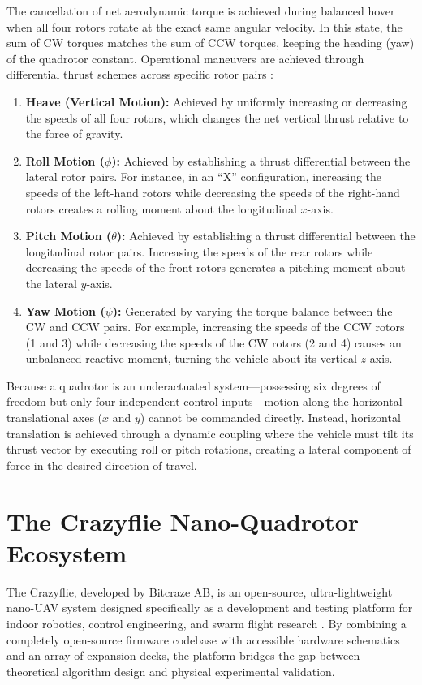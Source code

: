 The cancellation of net aerodynamic torque is achieved during balanced hover when all four rotors rotate at the exact same angular velocity. In this state, the sum of CW torques matches the sum of CCW torques, keeping the heading (yaw) of the quadrotor constant. Operational maneuvers are achieved through differential thrust schemes across specific rotor pairs \cite{ref_42, ref_49}:
\begin{enumerate}
    \item \textbf{Heave (Vertical Motion):} Achieved by uniformly increasing or decreasing the speeds of all four rotors, which changes the net vertical thrust relative to the force of gravity.
    \item \textbf{Roll Motion ($\phi$):} Achieved by establishing a thrust differential between the lateral rotor pairs. For instance, in an ``X'' configuration, increasing the speeds of the left-hand rotors while decreasing the speeds of the right-hand rotors creates a rolling moment about the longitudinal $x$-axis.
    \item \textbf{Pitch Motion ($\theta$):} Achieved by establishing a thrust differential between the longitudinal rotor pairs. Increasing the speeds of the rear rotors while decreasing the speeds of the front rotors generates a pitching moment about the lateral $y$-axis.
    \item \textbf{Yaw Motion ($\psi$):} Generated by varying the torque balance between the CW and CCW pairs. For example, increasing the speeds of the CCW rotors (1 and 3) while decreasing the speeds of the CW rotors (2 and 4) causes an unbalanced reactive moment, turning the vehicle about its vertical $z$-axis.
\end{enumerate}

Because a quadrotor is an underactuated system—possessing six degrees of freedom but only four independent control inputs—motion along the horizontal translational axes ($x$ and $y$) cannot be commanded directly. Instead, horizontal translation is achieved through a dynamic coupling where the vehicle must tilt its thrust vector by executing roll or pitch rotations, creating a lateral component of force in the desired direction of travel.

\section{The Crazyflie Nano-Quadrotor Ecosystem}
The Crazyflie, developed by Bitcraze AB, is an open-source, ultra-lightweight nano-UAV system designed specifically as a development and testing platform for indoor robotics, control engineering, and swarm flight research \cite{ref_41, ref_40}. By combining a completely open-source firmware codebase with accessible hardware schematics and an array of expansion decks, the platform bridges the gap between theoretical algorithm design and physical experimental validation.


